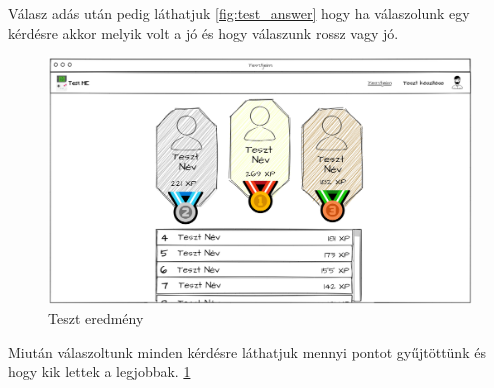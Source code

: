 Válasz adás után pedig láthatjuk \ref{fig:test_answer} hogy ha válaszolunk egy kérdésre akkor melyik volt a jó és hogy válaszunk rossz vagy jó.

\begin{figure}[H]
    \centering
    \includegraphics[width=\linewidth]{images/test3_wireframe.png}
    \caption{Teszt eredmény}
    \label{fig:test_finished}
\end{figure}

Miután válaszoltunk minden kérdésre láthatjuk mennyi pontot gyűjtöttünk és hogy kik lettek a legjobbak. \ref{fig:test_finished}



